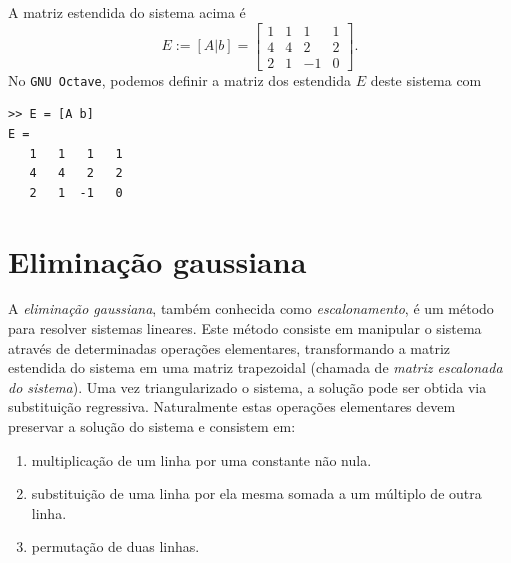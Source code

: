 \begin{ex}
A matriz estendida do sistema acima é
\begin{equation}
  E := [A|b] =
  \begin{bmatrix}
    1 & 1 & 1 & 1\\
    4 & 4 & 2 & 2\\
    2 & 1 & -1 & 0
  \end{bmatrix}.
\end{equation}
\ifisoctave
No \verb+GNU Octave+, podemos definir a matriz dos estendida $E$ deste sistema com
\begin{verbatim}
>> E = [A b]
E =
   1   1   1   1
   4   4   2   2
   2   1  -1   0
\end{verbatim}
\fi
\end{ex}




\section{Eliminação gaussiana}
A \emph{eliminação gaussiana}, também conhecida como \emph{escalonamento}, é um método para resolver sistemas lineares. Este método consiste em manipular o sistema através de determinadas operações elementares, transformando a matriz estendida do sistema em uma matriz trapezoidal (chamada de \emph{matriz escalonada do sistema}). Uma vez triangularizado o sistema, a solução pode ser obtida via substituição regressiva. Naturalmente estas operações elementares devem preservar a solução do sistema e consistem em:
\begin{enumerate}
\item multiplicação de um linha por uma constante não nula.
\item substituição de uma linha por ela mesma somada a um múltiplo de outra linha.
\item permutação de duas linhas.
\end{enumerate}


